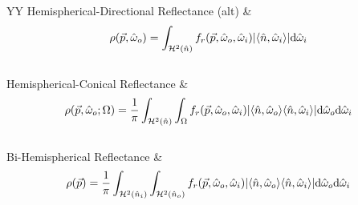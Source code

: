 {\begin{xltabular}{\linewidth}{YY}
		Hemispherical-Directional Reflectance (alt)\footnotemark{} &  \\
			{\begin{equation}\rho(\vec{p},\hat{\omega}_o) = \int_{\mathcal{H}^2(\hat{n})}f_r(\vec{p},\hat{\omega}_o,\hat{\omega}_i)\vert\langle\hat{n},\hat{\omega}_{i}\rangle\vert\mathrm{d}\hat{\omega}_{i}\end{equation}}\\
		Hemispherical-Conical Reflectance &  \\
			{\[\rho(\vec{p}, \hat{\omega}_o;\Omega) = %
			\frac{1}{\pi}\int_{\mathcal{H}^2(\hat{n})}\int_\Omega f_r(\vec{p},\hat{\omega}_o,\hat{\omega}_i)\vert\dotpr{o}%
			\dotpr{i}\vert\mathrm{d}\hat{\omega}_o\mathrm{d}\hat{\omega}_i\]}\\
		Bi-Hemispherical Reflectance &  \\
			{\begin{equation}\rho(\vec{p}) = \frac{1}{\pi}%
			\int_{\mathcal{H}^2(\hat{n}_i)}\int_{\mathcal{H}^2(\hat{n}_o)}f_r(\vec{p},\hat{\omega}_o,\hat{\omega}_i)\vert\dotpr{o}%
			\dotpr{i}\vert\mathrm{d}\hat{\omega}_o\mathrm{d}\hat{\omega}_i\end{equation}}\\
	\end{xltabular}
}
